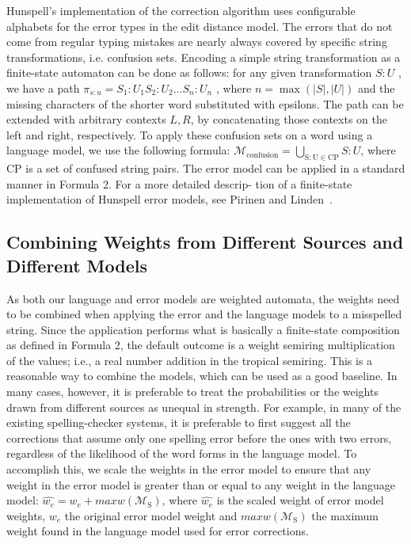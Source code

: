 \documentclass[postprint]{flammie}
\begin{document}
Hunspell’s implementation of the correction algorithm uses configurable
alphabets for the error types in the edit distance model. The errors that do
not come from regular typing mistakes are nearly always covered by specific
string transformations, i.e.  confusion sets. Encoding a simple string
transformation as a finite-state automaton can be done as follows: for any
given transformation $S:U$ , we have a path $\pi_{s:u} = S_1:U_1 S_2:U_2 \ldots S_n:U_n$ , where $n= \max(|S|, |U|)$ and
the missing characters of the shorter word substituted with epsilons. The path
can be extended with arbitrary contexts $L, R$, by concatenating those contexts
on the left and right, respectively. To apply these confusion sets on a word
using a language model, we use the following formula: $\mathcal{M}_\mathrm{confusion} = \bigcup_{\mathrm{S:U} \in \mathrm{CP}} S:U$, where $\mathrm{CP}$ is a set
of confused string pairs. The error model can be applied in a standard manner
in Formula 2. For a more detailed descrip- tion of a finite-state
implementation of Hunspell error models, see Pirinen and
Linden~\cite{pirinen2010creating}.

\subsection{Combining Weights from Different Sources and Different Models}

As both our language and error models are weighted automata, the weights need
to be combined when applying the error and the language models to a misspelled
string.  Since the application performs what is basically a finite-state
composition as defined in Formula 2, the default outcome is a weight semiring
multiplication of the values; i.e., a real number addition in the tropical
semiring. This is a reasonable way to combine the models, which can be used
as a good baseline. In many cases, however, it is preferable to treat the
probabilities or the weights drawn from different sources as unequal in
strength. For example, in many of the existing spelling-checker systems, it is
preferable to first suggest all the corrections that assume only one spelling
error before the ones with two errors, regardless of the likelihood of the word
forms in the language model. To accomplish this, we scale the weights in the
error model to ensure that any weight in the error model is greater than or
equal to any weight in the language model: $\hat{w_e} =
w_e + maxw(\mathcal{M}_\mathrm{S})$, where $\hat{w_e}$ is the scaled
weight of error model weights, $w_e$ the original error model weight and 
$maxw(\mathcal{M}_\mathrm{S})$ the
maximum weight found in the language model used for error corrections.
\end{document}
